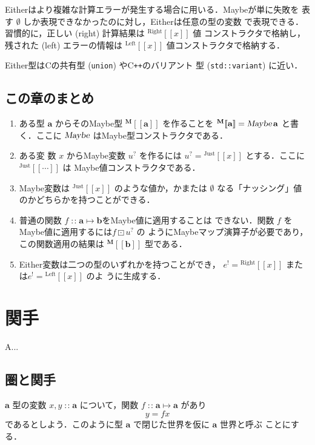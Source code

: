 \documentclass[a5paper,twoside,fleqn,draft]{jsbook}
\def\[{[\![}
\def\]{]\!]}
\newcommand{\programminglanguage}[1]{\textsf{#1}}
\newcommand{\clang}{\programminglanguage{C}}
\newcommand{\cxx}{\programminglanguage{C}\texttt{++}}
\newenvironment{leader}{\begingroup\gt}{\endgroup}
\newcommand{\code}[1]{\texttt{#1}}
\newcommand{\mNothing}{\emptyset}
\DeclareMathOperator{\mFuncArrow}{\mapsto}
\DeclareMathOperator{\mIn}{{:\!:}}
\DeclareMathOperator{\mMapMaybe}{\boxdot}
\newcommand{\mType}[1]{\mathbf{#1}} %
\newcommand{\mA}{\mType{a}}
\newcommand{\mB}{\mType{b}}
\newcommand{\mTypeAssemble}[2]{{}^\mType{#1}\[\mType{#2}\]}
\newcommand{\mMaybeType}[1]{\mTypeAssemble{M}{#1}}
\newcommand{\mTypeConstructor}[1]{\textsl{#1}}
\DeclareMathOperator{\mMaybeTypeConstructor}{\mTypeConstructor{Maybe}}
\newcommand{\mValueConstructor}[1]{\mathrm{#1}}
\newcommand{\mValueWith}[2]{{}^\mValueConstructor{#1}\[#2\]}
\newcommand{\mLeftWith}[1]{\mValueWith{Left}{#1}}
\newcommand{\mRightWith}[1]{\mValueWith{Right}{#1}}
\newcommand{\mJustWith}[1]{\mValueWith{Just}{#1}}
\newcommand{\mEither}[1]{{#1}^!}
\newcommand{\mMaybe}[1]{{#1}^?}
\newcommand{\mProjEXP}[2]{#1\mFuncArrow#2} %
\begin{document}
Eitherはより複雑な計算エラーが発生する場合に用いる．Maybeが単に失敗を
表す $\mNothing$ しか表現できなかったのに対し，Eitherは任意の型の変数
で表現できる．習慣的に，正しい (right) 計算結果は $\mRightWith{x}$ 値
コンストラクタで格納し，残された (left) エラーの情報は $\mLeftWith{x}$
値コンストラクタで格納する．

Either型は\clang の共有型 (\code{union}) や\cxx のバリアント
型 (\code{std::variant}) に近い．

\section{この章のまとめ}

\begin{enumerate}
\item ある型 $\mA $ からそのMaybe型 $\mMaybeType{a}$ を作ることを
  $\mMaybeType{a}=\mMaybeTypeConstructor\mA $ と書く．ここに
  $\mMaybeTypeConstructor$ はMaybe型コンストラクタである．\item ある変
  数 $x$ からMaybe変数 $\mMaybe{u}$ を作るには
  $\mMaybe{u}=\mJustWith{x}$ とする．ここに $\mJustWith{\dotsb}$ は
  Maybe値コンストラクタである．
\item Maybe変数は $\mJustWith{x}$ のような値か，かまたは $\mNothing$
  なる「ナッシング」値のかどちらかを持つことができる．
\item 普通の関数 $f\mIn\mProjEXP{\mA }{\mB }$をMaybe値に適用することは
  できない．関数 $f$ をMaybe値に適用するには$f\mMapMaybe\mMaybe{u}$ の
  ようにMaybeマップ演算子が必要であり，この関数適用の結果は
  $\mMaybeType{b}$ 型である．
\item Either変数は二つの型のいずれかを持つことができ，
  $\mEither{e}=\mRightWith{x}$ または$\mEither{e}=\mLeftWith{x}$ のよ
  うに生成する．
\end{enumerate}

\chapter{関手}
\label{ch:functor}

\begin{leader}
A...
\end{leader}

\section{圏と関手}

$\mA $ 型の変数 $x,y\mIn\mA$ について，関数 $f\mIn\mA\mFuncArrow\mA$ があり
\begin{equation}
  y
  =fx
\end{equation}
であるとしよう．このように型 $\mA$ で閉じた世界を仮に $\mA$ 世界と呼ぶ
ことにする．
\end{document}

